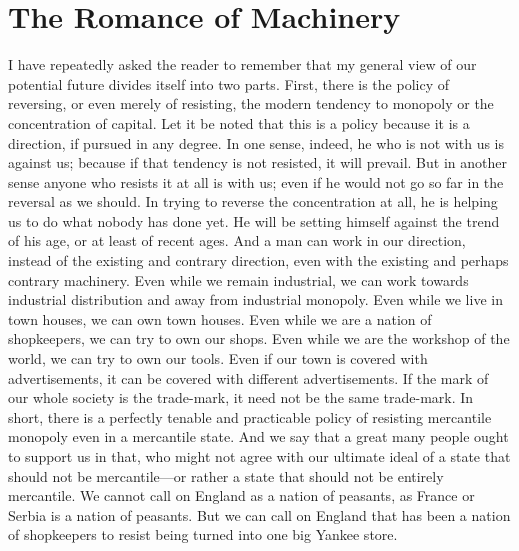 \documentclass{book}
\begin{document}
\chapter{The Romance of Machinery}
\label{chapter-16}
I have repeatedly asked the reader to remember that my general view of our potential future divides itself into two parts. First, there is the policy of reversing, or even merely of resisting, the modern tendency to monopoly or the concentration of capital. Let it be noted that this is a policy because it is a direction, if pursued in any degree. In one sense, indeed, he who is not with us is against us; because if that tendency is not resisted, it will prevail. But in another sense anyone who resists it at all is with us; even if he would not go so far in the reversal as we should. In trying to reverse the concentration at all, he is helping us to do what nobody has done yet. He will be setting himself against the trend of his age, or at least of recent ages. And a man can work in our direction, instead of the existing and contrary direction, even with the existing and perhaps contrary machinery. Even while we remain industrial, we can work towards industrial distribution and away from industrial monopoly. Even while we live in town houses, we can own town houses. Even while we are a nation of shopkeepers, we can try to own our shops. Even while we are the workshop of the world, we can try to own our tools. Even if our town is covered with advertisements, it can be covered with different advertisements. If the mark of our whole society is the trade-mark, it need not be the same trade-mark. In short, there is a perfectly tenable and practicable policy of resisting mercantile monopoly even in a mercantile state. And we say that a great many people ought to support us in that, who might not agree with our ultimate ideal of a state that should not be mercantile—or rather a state that should not be entirely mercantile. We cannot call on England as a nation of peasants, as France or Serbia is a nation of peasants. But we can call on England that has been a nation of shopkeepers to resist being turned into one big Yankee store.
\end{document}
